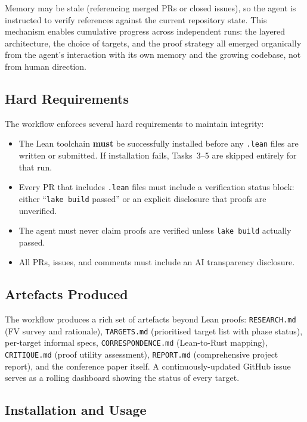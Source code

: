 \documentclass[sigconf,10pt]{acmart}
\begin{document}
Memory may be stale (referencing merged PRs or closed issues), so the
agent is instructed to verify references against the current repository
state.  This mechanism enables cumulative progress across independent
runs: the layered architecture, the choice of targets, and the
proof strategy all emerged organically from the agent's interaction
with its own memory and the growing codebase, not from human direction.

\subsection{Hard Requirements}

The workflow enforces several hard requirements to maintain integrity:

\begin{itemize}\setlength\itemsep{0pt}
\item The Lean toolchain \textbf{must} be successfully installed before
  any \texttt{.lean} files are written or submitted.  If installation
  fails, Tasks~3--5 are skipped entirely for that run.
\item Every PR that includes \texttt{.lean} files must include a
  verification status block: either ``\texttt{lake build} passed'' or
  an explicit disclosure that proofs are unverified.
\item The agent must never claim proofs are verified unless
  \texttt{lake build} actually passed.
\item All PRs, issues, and comments must include an AI transparency
  disclosure.
\end{itemize}

\subsection{Artefacts Produced}

The workflow produces a rich set of artefacts beyond Lean proofs:
\texttt{RESEARCH.md} (FV survey and rationale),
\texttt{TARGETS.md} (prioritised target list with phase status),
per-target informal specs,
\texttt{CORRESPONDENCE.md} (Lean-to-Rust mapping),
\texttt{CRITIQUE.md} (proof utility assessment),
\texttt{REPORT.md} (comprehensive project report),
and the conference paper itself.  A continuously-updated GitHub
issue serves as a rolling dashboard showing the status of every
target.

\subsection{Installation and Usage}
\label{sec:install}
\end{document}

